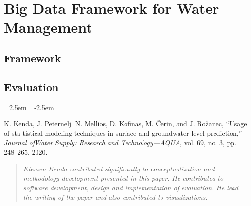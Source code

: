 % 
\chapter{Big Data Framework for Water Management}
\label{ch:results}

\section{Framework}

\section{Evaluation}


\begin{list}{}
{\leftmargin=2.5em \itemindent=-2.5em}
    \item K. Kenda, J. Peternelj, N. Mellios, D. Kofinas, M. Čerin, and J. Rožanec, “Usage of sta-tistical modeling techniques in surface and groundwater level prediction,” \textit{Journal ofWater Supply: Research and Technology—AQUA}, vol. 69, no. 3, pp. 248–265, 2020.
\end{list}

\begin{quote}
    \textit{Klemen Kenda contributed significantly to conceptualization and methodology development presented in this paper. 
    He contributed to software development, design and implementation of evaluation.
    He lead the writing of the paper and also contributed to visualizations.}
\end{quote}

